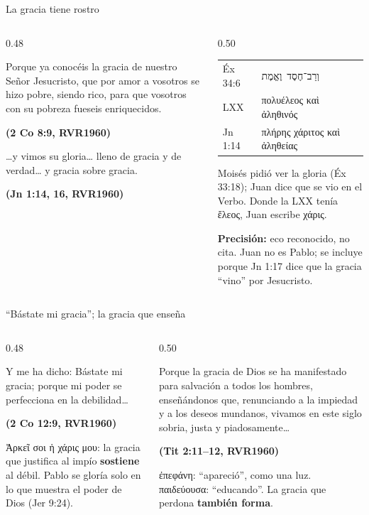 \documentclass[hyperref={bookmarks=false},aspectratio=169]{beamer}
\newcommand{\heb}[1]{\mbox{\foreignlanguage{hebrew}{#1}}}
\newcommand{\grc}[1]{\foreignlanguage{ancientgreek}{#1}}
\newcommand{\fuente}[1]{\par\hfill{\upshape\bfseries\footnotesize\textcolor{azul}{#1}}}
\newcommand{\destacar}[1]{\textbf{\textcolor{azul}{#1}}}
\newcommand{\precision}[1]{{\footnotesize\color{gris}\textbf{Precisión:} #1}}
\begin{document}
\begin{frame}{La gracia tiene rostro}
\begin{columns}[t,onlytextwidth]
\begin{column}{0.48\textwidth}
\begin{cita}Porque ya conocéis la gracia de nuestro Señor Jesucristo, que por amor a vosotros se hizo pobre, siendo rico, para que vosotros con su pobreza fueseis enriquecidos.\fuente{(2 Co 8:9, RVR1960)}\end{cita}
\begin{cita}\ldots{}y vimos su gloria\ldots{} lleno de gracia y de verdad\ldots{} y gracia sobre gracia.\fuente{(Jn 1:14, 16, RVR1960)}\end{cita}
\end{column}
\begin{column}{0.50\textwidth}
\scriptsize\renewcommand{\arraystretch}{1.15}
\begin{tabular}{@{}>{\RaggedRight\arraybackslash}p{1.3cm}>{\RaggedRight\arraybackslash}p{4.4cm}@{}}
\toprule
Éx 34:6 & \heb{וְרַב־חֶסֶד וֶאֱמֶת} \\
LXX & \grc{πολυέλεος καὶ ἀληθινός} \\
Jn 1:14 & \grc{πλήρης χάριτος καὶ ἀληθείας} \\
\bottomrule
\end{tabular}\par\medskip
\small\RaggedRight Moisés pidió ver la gloria (Éx 33:18); Juan dice que se vio en el Verbo. Donde la LXX tenía \grc{ἔλεος}, Juan escribe \grc{χάρις}.\par
\precision{eco reconocido, no cita. Juan no es Pablo; se incluye porque Jn 1:17 dice que la gracia ``vino'' por Jesucristo.}
\end{column}
\end{columns}
\end{frame}

\begin{frame}{``Bástate mi gracia''; la gracia que enseña}
\begin{columns}[t,onlytextwidth]
\begin{column}{0.48\textwidth}
\begin{cita}Y me ha dicho: Bástate mi gracia; porque mi poder se perfecciona en la debilidad\ldots\fuente{(2 Co 12:9, RVR1960)}\end{cita}
\scriptsize \grc{Ἀρκεῖ σοι ἡ χάρις μου}: la gracia que justifica al impío \destacar{sostiene} al débil. Pablo se gloría solo en lo que muestra el poder de Dios (Jer 9:24).
\end{column}
\begin{column}{0.50\textwidth}
\begin{cita}Porque la gracia de Dios se ha manifestado para salvación a todos los hombres, enseñándonos que, renunciando a la impiedad y a los deseos mundanos, vivamos en este siglo sobria, justa y piadosamente\ldots\fuente{(Tit 2:11--12, RVR1960)}\end{cita}
\scriptsize \grc{ἐπεφάνη}: ``apareció'', como una luz. \grc{παιδεύουσα}: ``educando''. La gracia que perdona \destacar{también forma}.
\end{column}
\end{columns}
\end{frame}
\end{document}
